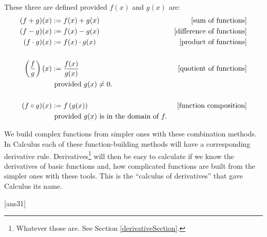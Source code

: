 \documentclass{amsbook}
\numberwithin{section}{chapter}
\numberwithin{equation}{chapter}
\begin{document}
These three are defined provided $f(x)$ and $g(x)$ are:
\begin{align*}
(f+g)(x) &:= f(x)+g(x) &\text{[sum of functions]}\\
(f-g)(x) &:= f(x)-g(x) &\text{[difference of functions]}\\
(f \cdot g)(x) &:= f(x)\cdot g(x) &\text{[product of functions]}\\
 & & \\
\left( \frac{f}{g} \right)(x) &:= \frac{f(x)}{g(x)} &\text{[quotient of functions]}\\
 &\text{ provided } g(x)\neq 0. &\\
 & & \\
(f \circ g)(x) &:= f\left( g(x) \right) &\text{[function composition]\index{composition}\index{function composition}}\\
 &\text{ provided } g(x)\text{ is in the domain of } f. &\\
\end{align*}

We build complex functions from simpler ones with these combination methods. In Calculus each of these function-building methods will have a corresponding derivative rule. Derivatives\footnote{Whatever those are. See Section \ref{derivativeSection}.} will then be easy to calculate if we know the derivatives of basic functions and, how complicated functions are built from the simpler ones with these tools. This is the ``calculus of derivatives'' that gave Calculus its name.

[ans31]
\end{document}
